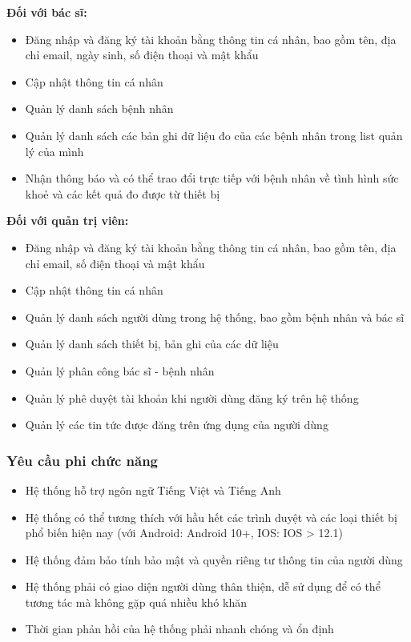 \textbf{Đối với bác sĩ:}
\begin{adjustwidth}{1.5em}{}
\begin{itemize}
    \item Đăng nhập và đăng ký tài khoản bằng thông tin cá nhân, bao gồm tên, địa chỉ email, ngày sinh, số điện thoại và mật khẩu
    \item Cập nhật thông tin cá nhân
    \item Quản lý danh sách bệnh nhân
    \item Quản lý danh sách các bản ghi dữ liệu đo của các bệnh nhân trong list quản lý của mình
    \item Nhận thông báo và có thể trao đổi trực tiếp với bệnh nhân về tình hình sức khoẻ và các kết quả đo được từ thiết bị
\end{itemize}
\end{adjustwidth}
\textbf{Đối với quản trị viên:}
\begin{adjustwidth}{1.5em}{}
\begin{itemize}
    \item Đăng nhập và đăng ký tài khoản bằng thông tin cá nhân, bao gồm tên, địa chỉ email, số điện thoại và mật khẩu
    \item Cập nhật thông tin cá nhân
    \item Quản lý danh sách người dùng trong hệ thống, bao gồm bệnh nhân và bác sĩ
    \item Quản lý danh sách thiết bị, bản ghi của các dữ liệu
    \item Quản lý phân công bác sĩ - bệnh nhân
    \item Quản lý phê duyệt tài khoản khi người dùng đăng ký trên hệ thống
    \item Quản lý các tin tức được đăng trên ứng dụng của người dùng
\end{itemize}
\end{adjustwidth}

\subsubsection{Yêu cầu phi chức năng}
\begin{itemize}
    \item Hệ thống hỗ trợ ngôn ngữ Tiếng Việt và Tiếng Anh
    \item Hệ thống có thể tương thích với hầu hết các trình duyệt và các loại thiết bị phổ biến hiện nay (với Android: Android 10+, IOS: IOS > 12.1)
    \item Hệ thống đảm bảo tính bảo mật và quyền riêng tư thông tin của người dùng
    \item Hệ thống phải có giao diện người dùng thân thiện, dễ sử dụng để có thể tương tác mà không gặp quá nhiều khó khăn
    \item Thời gian phản hồi của hệ thống phải nhanh chóng và ổn định
\end{itemize}

